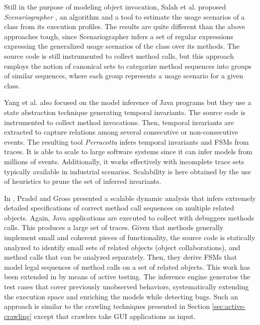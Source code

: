 Still in the purpose of modeling object invocation, Salah et al.
proposed \textit{Scenariographer} \cite{Salah05scenariographer},
an algorithm and a tool to estimate the usage scenarios of a
class from its execution profiles. The results are quite
different than the above approaches tough, since Scenariographer
infers a set of regular expressions expressing the generalized
usage scenarios of the class over its methods. The source code is
still instrumented to collect method calls, but this approach
employs the notion of canonical sets to categorize method
sequences into groups of similar sequences, where each group
represents a usage scenario for a given class.

Yang et al. \cite{Yang:2006:PMT:1134285.1134325} also focused on
the model inference of Java programs but they use a state
abstraction technique generating temporal invariants. The source
code is instrumented to collect method invocations. Then,
temporal invariants are extracted to capture relations among
several consecutive or non-consecutive events. The resulting tool
\textit{Perracotta} infers temporal invariants and FSMs from
traces. It is able to scale to large software systems since it
can infer models from millions of events. Additionally, it works
effectively with incomplete trace sets typically available in
industrial scenarios. Scalability is here obtained by the use of
heuristics to prune the set of inferred invariants.

In \cite{Pradel:2009}, Pradel and Gross presented a scalable
dynamic analysis that infers extremely detailed specifications of
correct method call sequences on multiple related objects. Again,
Java applications are executed to collect with debuggers methods
calls. This produces a large set of traces. Given that methods
generally implement small and coherent pieces of functionality,
the source code is statically analyzed to identify small sets of
related objects (object collaborations), and method calls that
can be analyzed separately. Then, they derive FSMs that model
legal sequences of method calls on a set of related objects. This
work has been extended in \cite{Dallmeier_generatingtest} by
means of active testing. The inference engine generates the test
cases that cover previously unobserved behaviors, systematically
extending the execution space and enriching the models while
detecting bugs. Such an approach is similar to the crawling
techniques presented in Section \ref{sec:active-crawling} except
that crawlers take GUI applications as input.

